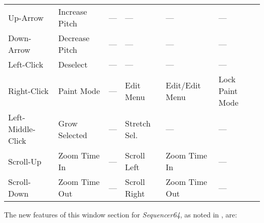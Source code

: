\begin{table}
\begin{tabular}{l l l l l l}
         Up-Arrow          & Increase Pitch  & ---                &
            ---            & ---             & ---                \\
         Down-Arrow        & Decrease Pitch  & ---                &
            ---            & ---             & ---                \\
         Left-Click        & Deselect        & ---                &
            ---            & ---             & ---                \\
         Right-Click       & Paint Mode      & ---                &
            Edit Menu      & Edit/Edit Menu  & Lock Paint Mode    \\
         Left-Middle-Click & Grow Selected   & ---                &
            Stretch Sel.   & ---             & ---                \\
         Scroll-Up         & Zoom Time In    & ---                &
            Scroll Left    & Zoom Time In    & ---                \\
         Scroll-Down       & Zoom Time Out   & ---                &
            Scroll Right   & Zoom Time Out   & ---                \\
      \end{tabular}
   \end{table}

   The new features of this window section for \textsl{Sequencer64},
   as noted in
   , are:


